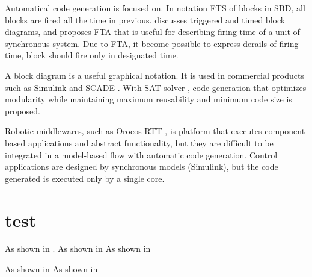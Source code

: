 \documentclass[conference,compsoc]{IEEEtran}
\providecommand{\DIFadd}[1]{{\protect\color{blue}\uwave{#1}}} %
\providecommand{\DIFaddbegin}{} %
\providecommand{\DIFaddend}{} %
\providecommand{\DIFdelbegin}{} %
\providecommand{\DIFdelend}{} %
\begin{document}
 Automatical code generation is focused on.
In notation FTS of blocks in \DIFaddbegin \DIFadd{an }\DIFaddend SBD, all blocks are fired all the time in previous. 
\cite{4550788} discusses triggered and timed block diagrams, and proposes FTA that is useful for describing firing time of a unit of synchronous system.
Due to FTA, it become possible to express derails of firing time, block should fire only in designated time.

 A block diagram is a useful graphical notation. 
It is used in commercial products such as Simulink and SCADE \cite{Lublinerman:2009:MCG:1480881.1480893}.
With SAT solver \cite{Lublinerman:2009:MCG:1480881.1480893}, code generation that optimizes modularity while maintaining maximum reusability and minimum code size is proposed.

 Robotic middlewares, such as Orocos-RTT \cite{}, is platform that executes component-based applications and abstract functionality, but they are difficult to be integrated in a model-based flow with automatic code generation.
 Control applications are designed by synchronous models (Simulink), but the code generated is executed only by a single core.

\DIFaddbegin \section{\DIFadd{CONCLUTION}}

\DIFaddend \section{test}

As shown in \cite{Deng:2015:MSF:2735960.2735972}.
As shown in \cite{6871195}
As shown in \cite{4550788}
\DIFdelbegin %

\DIFdelend As shown in \cite{Lublinerman:2009:MCG:1480881.1480893}
As shown in \cite{Ptolemaeus:14:SystemDesign}


\end{document}
